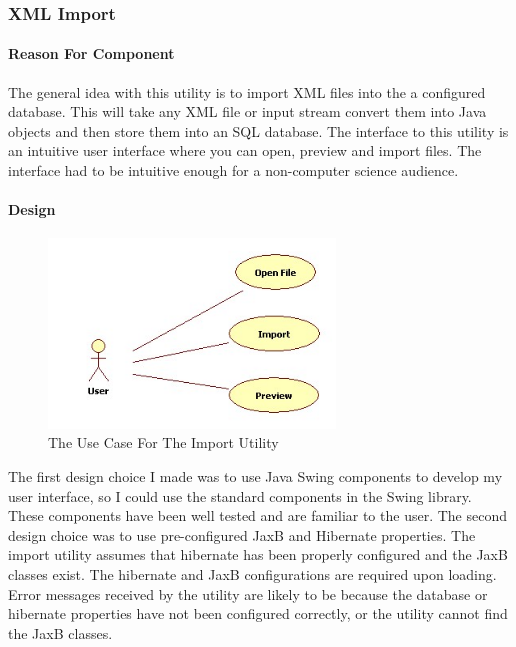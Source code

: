 \subsubsection{XML Import}
\paragraph{Reason For Component}

The general idea with this utility is to import XML files into the a configured database. This will take any XML file or input stream convert them into Java objects and then store them into an SQL database. The interface to this utility is an intuitive user interface where you can open, preview and import files. The interface had to be intuitive enough for a non-computer science audience. 


\paragraph{Design}
\begin{figure}[h]
	\centering
		\includegraphics[width=3.00in]{Images/ImportUse.jpg}
	\caption{The Use Case For The Import Utility}
	\label{fig:Import Use}
\end{figure}
\par
The first design choice I made was to use Java Swing components to develop my user interface, so I could use the standard components in the Swing library. These components have been well tested and are familiar to the user. The second design choice was to use pre-configured JaxB and Hibernate properties. The import utility assumes that hibernate has been properly configured and the JaxB classes exist. The hibernate and JaxB configurations are required upon loading. Error messages received by the utility are likely to be because the database or hibernate properties have not been configured correctly, or the utility cannot find the JaxB classes. 
\par
